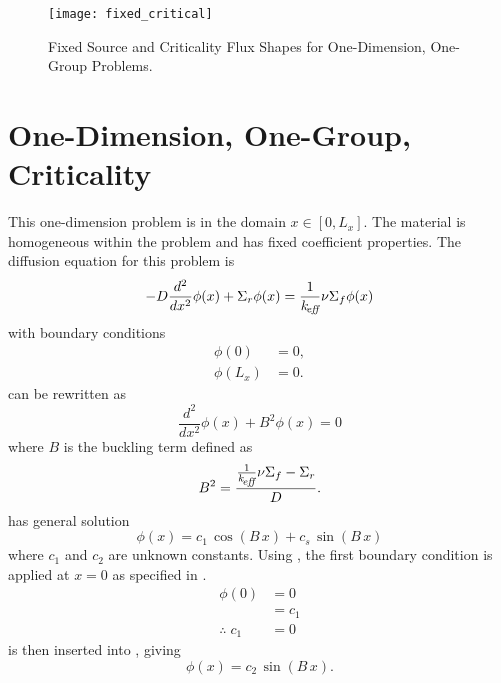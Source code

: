  \begin{figure}
    \centering
    \texttt{[image: fixed\_critical]}
    \caption{Fixed Source and Criticality Flux Shapes for One-Dimension,
      One-Group Problems.}
    \label{fig:fixed_critical}
  \end{figure}
  
\section{One-Dimension, One-Group, Criticality} 
  \label{sec:deriv_1d1g}
  This one-dimension problem is in the domain $x \in [0,L_x]$. The material
  is homogeneous within the problem and has fixed coefficient properties. The
  diffusion equation for this problem is
  \begin{equation}
    \label{eq:1d1g}
    -D \frac{d^2}{dx^2} \phi(x) + \Sigma_r \phi(x) = 
      \frac{1}{k_{\!\mbox{\scriptsize \em eff}}} \nu \Sigma_f \phi(x)
  \end{equation}
  with boundary conditions
  \begin{align}
    \label{eq:1d1g_bc1}
    \phi(0) &= 0 ,\\
    \label{eq:1d1g_bc2}
    \phi(L_x) &= 0.
  \end{align}
   can be rewritten as
  \begin{equation}
    \label{eq:1d1g_buckle}
    \frac{d^2}{dx^2} \phi(x) + B^2 \phi(x) = 0
  \end{equation}
  where $B$ is the buckling term defined as
  \begin{equation}
    \label{eq:1d1g_b2}
    B^2 = \frac{\frac{1}{k_{\!\mbox{\scriptsize \em eff}}} \nu \Sigma_f - \Sigma_r}{D}.
  \end{equation}
   has general solution 
  \begin{equation}
    \label{eq:1d1g_general}
    \phi(x) = c_1 \, \cos(B \, x) + c_s \, \sin(B \, x)
  \end{equation}
  where $c_1$ and $c_2$ are unknown constants.
  Using , the first boundary condition is applied at $x=0$
  as specified in .
  \begin{align}
    \phi(0) &= 0 \\
    &= c_1 \\
    \label{eq:1d1g_c1}
    \therefore \; c_1 &= 0
  \end{align}
   is then inserted into , giving
  \begin{equation}
    \label{eq:1d1g_sin}
    \phi(x) = c_2 \, \sin(B \, x).
  \end{equation}
